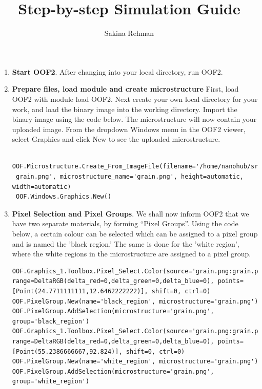 \documentclass{article}
\title{\bf Step-by-step Simulation Guide}
\author{Sakina Rehman}
\begin{document}
\maketitle

\begin{enumerate}

\item  \textbf{Start OOF2}. After changing into your local directory, run OOF2.

\item  \textbf{Prepare files, load module and create microstructure} First, load OOF2 with module load OOF2. Next create your own local directory for your work, and load the binary image into the working directory. Import the binary image using the code below. The microstructure will now contain your uploaded image. From the dropdown Windows menu in the OOF2 viewer, select Graphics and click New to see the uploaded microstructure.

\lstset{language=Python}
\begin{lstlisting}
 OOF.Microstructure.Create_From_ImageFile(filename='/home/nanohub/srehman6/data/results/1643665/
 grain.png', microstructure_name='grain.png', height=automatic, width=automatic)
 OOF.Windows.Graphics.New()
\end{lstlisting}

\item  \textbf{Pixel Selection and Pixel Groups}. We shall now inform OOF2 that we have two separate materials, by forming “Pixel Groups”. Using the code below, a certain colour can be selected which can be assigned to a pixel group and is named the 'black region.' The same is done for the 'white region', where the white regions in the microstructure are assigned to a pixel group.

\lstset{language=Python}
\begin{lstlisting}
OOF.Graphics_1.Toolbox.Pixel_Select.Color(source='grain.png:grain.png', range=DeltaRGB(delta_red=0,delta_green=0,delta_blue=0), points=[Point(24.7711111111,12.6462222222)], shift=0, ctrl=0)
OOF.PixelGroup.New(name='black_region', microstructure='grain.png')
OOF.PixelGroup.AddSelection(microstructure='grain.png', group='black_region')
OOF.Graphics_1.Toolbox.Pixel_Select.Color(source='grain.png:grain.png', range=DeltaRGB(delta_red=0,delta_green=0,delta_blue=0), points=[Point(55.2386666667,92.824)], shift=0, ctrl=0)
OOF.PixelGroup.New(name='white_region', microstructure='grain.png')
OOF.PixelGroup.AddSelection(microstructure='grain.png', group='white_region')
\end{lstlisting}


\end{enumerate}
\end{document}
